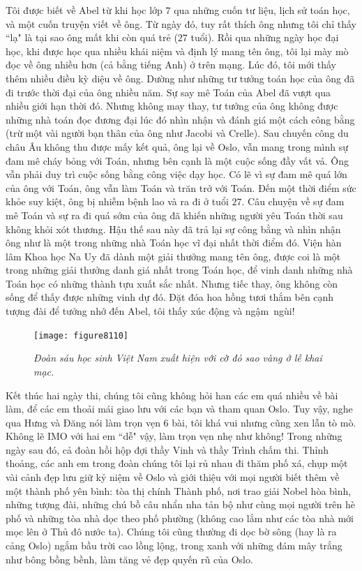 \begin{multicols}{2}
	Tôi được biết về Abel từ khi học lớp $7$ qua những cuốn tư liệu, lịch sử toán học, và một cuốn truyện viết về ông. Từ ngày đó, tuy rất thích ông nhưng tôi chỉ thấy ``lạ" là tại sao ông mất khi còn quá trẻ ($27$ tuổi). Rồi qua những ngày học đại học, khi được học qua nhiều khái niệm và định lý mang tên ông, tôi lại mày mò đọc về ông nhiều hơn (cả bằng tiếng Anh) ở trên mạng. Lúc đó, tôi mới thấy thêm nhiều điều kỳ diệu về ông. Dường như những tư tưởng toán học của ông đã đi trước thời đại của ông nhiều năm. Sự say mê Toán của Abel đã vượt qua nhiều giới hạn thời đó. Nhưng không may thay, tư tưởng của ông không được những nhà toán đọc đương đại lúc đó nhìn nhận và đánh giá một cách công bằng (trừ một vài người bạn thân của ông như Jacobi và Crelle). Sau chuyến công du châu Âu không thu được mấy kết quả, ông lại về Oslo, vẫn mang trong mình sự đam mê cháy bỏng với Toán, nhưng bên cạnh là một cuộc sống đầy vất vả. Ông vẫn phải duy trì cuộc sống bằng công việc dạy học. Có lẽ vì sự đam mê quá lớn của ông với Toán, ông vẫn làm Toán và trăn trở với Toán. Đến một thời điểm sức khỏe suy kiệt, ông bị nhiễm bệnh lao và ra đi ở tuổi $27$. Câu chuyện về sự đam mê Toán và sự ra đi quá sớm của ông đã khiến những người yêu Toán thời sau không khỏi xót thương. Hậu thế sau này đã trả lại sự công bằng và nhìn nhận ông như là một trong những nhà Toán học vĩ đại nhất thời điểm đó. Viện hàn lâm Khoa học Na Uy đã dành một giải thưởng mang tên ông, được coi là một trong những giải thưởng danh giá nhất trong Toán học, để vinh danh những nhà Toán học có những thành tựu xuất sắc nhất. Nhưng tiếc thay, ông không còn sống để thấy được những vinh dự đó. Đặt đóa hoa hồng tươi thắm bên cạnh tượng đài để tưởng nhớ đến Abel, tôi thấy xúc động và ngậm~ngùi!
	\begin{figure}[H]
		\vspace*{-5pt}
		\centering
		\captionsetup{labelformat= empty, justification=centering}
		\texttt{[image: figure8110]}
		\caption{\small\textit{\color{cackithi}Đoàn sáu học sinh Việt Nam xuất hiện với cờ đỏ sao vàng ở lễ khai mạc.}}
		\vspace*{-10pt}
	\end{figure}
	Kết thúc hai ngày thi, chúng tôi cũng không hỏi han các em quá nhiều về bài làm, để các em thoải mái giao lưu với các bạn và tham quan Oslo. Tuy vậy, nghe qua Hưng và Đăng nói làm trọn vẹn $6$ bài, tôi khá vui nhưng cũng xen lẫn tò mò. Không lẽ IMO với hai em ``dễ" vậy, làm trọn vẹn nhẹ như không!
	\vskip 0.05cm
	Trong những ngày sau đó, cả đoàn hồi hộp đợi thầy Vinh và thầy Trình chấm thi. Thỉnh thoảng, các anh em trong đoàn chúng tôi lại rủ nhau đi thăm phố xá, chụp một vài cảnh đẹp lưu giữ kỷ niệm về Oslo và giới thiệu với mọi người biết thêm về một thành phố yên bình: tòa thị chính Thành phố, nơi trao giải Nobel hòa bình, những tượng đài, những chú bồ câu nhẩn nha tản bộ như cùng mọi người trên hè phố và những tòa nhà dọc theo phố phường (không cao lắm như các tòa nhà mới mọc lên ở Thủ đô nước ta). Chúng tôi cũng thường đi dọc bờ sông (hay là ra cảng Oslo) ngắm bầu trời cao lồng lộng, trong xanh với những đám mây trắng như bông bồng bềnh, làm tăng vẻ đẹp quyến rũ của Oslo.

\end{multicols}
